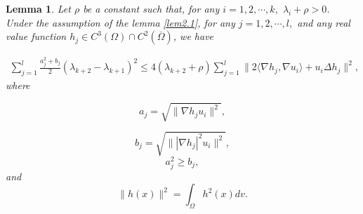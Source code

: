 \documentclass[12pt]{article}
\newtheorem{lem}[thm]{Lemma}
\numberwithin{equation}{section}
\begin{document}
\begin{lem}\label{lem2.3}Let $\rho $ be a constant such that, for any $i=1,2,\cdots,k,$ $\lambda_{i}+\rho>0$.
Under the assumption of the lemma \ref{lem2.1}, for any $j=1,2,\cdots,l,$ and any real value function $h_{j}\in C^{3}(\Omega)\cap C^{2}(\overline{\Omega})$,  we have

\begin{equation}\begin{aligned}\label{general-formula-2}\sum_{j=1}^{l}\frac{a_{j}^{2}+b_{j}}{2}\left(\lambda_{k+2}-\lambda_{k+1}\right)^{2}
\leq4(\lambda_{k+2}+\rho)\sum_{j=1}^{l}\|2\langle\nabla h_{j},\nabla u_{i}\rangle+u_{i}\Delta h_{j}\|^{2}
,
\end{aligned}\end{equation}
where

\begin{equation*}a_{j}=\sqrt{\|\nabla h_{j}u_{i}\|^{2}},\end{equation*}

\begin{equation*}b_{j}=\sqrt{\||\nabla h_{j}|^{2}u_{i}\|^{2}},\end{equation*}
\begin{equation}a_{j}^{2}\geq b_{j},\end{equation}  and \begin{equation*}
\|h(x)\|^{2}=\int_{\Omega}h^{2}(x)dv.
\end{equation*}

\end{lem}
\end{document}
